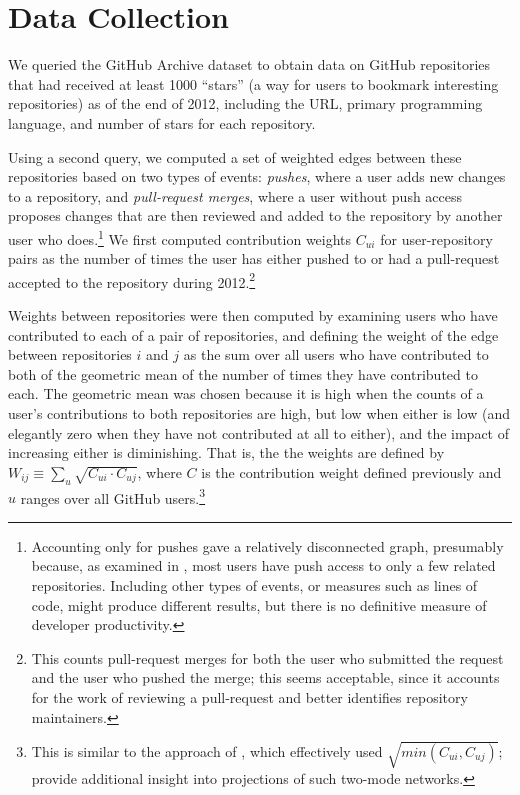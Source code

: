 \documentclass[11pt]{article}
\begin{document}
\section{Data Collection}
We queried the GitHub Archive dataset\cite{githubarchive} to obtain data on
GitHub repositories that had received at least 1000 ``stars'' (a way for users
to bookmark interesting repositories) as of the end of 2012, including the URL,
primary programming language, and number of stars for each repository.

Using a second query, we computed a set of weighted edges between these
repositories based on two types of events: \emph{pushes}, where a user adds new
changes to a repository, and \emph{pull-request merges}, where a user without
push access proposes changes that are then reviewed and added to the repository
by another user who does.\footnote{Accounting only for pushes gave a relatively
disconnected graph, presumably because, as examined in \cite{khadke}, most users
have push access to only a few related repositories.  Including other types of
events, or measures such as lines of code, might produce different results, but
there is no definitive measure of developer productivity.} We first computed
contribution weights $C_{ui}$ for user-repository pairs as the number of times
the user has either pushed to or had a pull-request accepted to the repository
during 2012.\footnote{This counts pull-request merges for both the user who
submitted the request and the user who pushed the merge; this seems acceptable,
since it accounts for the work of reviewing a pull-request and better identifies
repository maintainers.}

Weights between repositories were then computed by examining users who have
contributed to each of a pair of repositories, and defining the weight of the
edge between repositories $i$ and $j$ as the sum over all users who have
contributed to both of the geometric mean of the number of times they have
contributed to each. The geometric mean was chosen because it is high when the
counts of a user's contributions to both repositories are high, but low when
either is low (and elegantly zero when they have not contributed at all to
either), and the impact of increasing either is diminishing. That is, the the
weights are defined by $W_{ij} \equiv \sum_u \sqrt{C_{ui} \cdot C_{uj}}$,
where $C$ is the contribution weight defined previously and $u$ ranges over all
GitHub users.\footnote{This is similar to the approach of \cite{marrama}, which
effectively used $\sqrt{min(C_{ui}, C_{uj})}$; \cite{opsahlproj,opsahl11}
provide additional insight into projections of such two-mode networks.}
\end{document}
